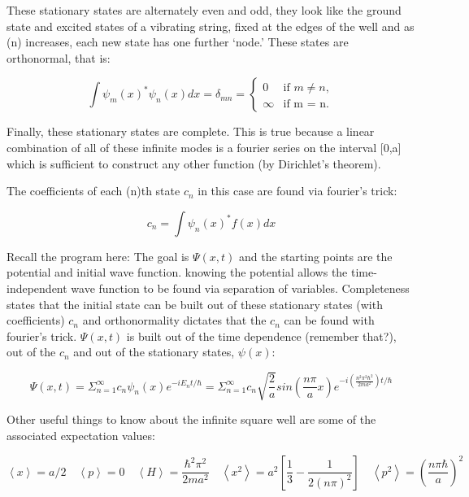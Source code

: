 \documentclass[aps,pre,nofootinbib]{revtex4}
\begin{document}
These stationary states are alternately even and odd, they look like the ground state and excited states of a vibrating string, fixed at the edges of the well and as (n) increases, each new state has one further `node.'  These states are orthonormal, that is:

\begin{equation}
\int \psi_m(x)^* \psi_n(x) dx = \delta_{mn} = 
\begin{cases} 
0 & \text{if $m \neq n$}, \\ 
\infty & \text{if m = n}. 
\end{cases} 
\end{equation}

Finally, these stationary states are complete.  This is true because a linear combination of all of these infinite modes is a fourier series on the interval [0,a] which is sufficient to construct any other function (by Dirichlet's theorem).

The coefficients of each (n)th state $c_n$ in this case are found via fourier's trick:

\begin{equation}
c_n = \int \psi_n(x)^* f(x) dx
\end{equation}

Recall the program here:  The goal is $\Psi(x,t)$ and the starting points are the potential and initial wave function.  knowing the potential allows the time-independent wave function to be found via separation of variables.  Completeness states that the initial state can be built out of these stationary states (with coefficients) $c_n$ and orthonormality dictates that the $c_n$ can be found with fourier's trick.  $\Psi(x,t)$ is built out of the time dependence (remember that?), out of the $c_n$ and out of the stationary states, $\psi(x)$:

\begin{equation}
\Psi(x,t) = \Sigma^{\infty}_{n=1}c_n\psi_n(x)e^{-iE_nt/\hbar} = \Sigma^{\infty}_{n=1}c_n\sqrt{\frac{2}{a}}sin({\frac{n\pi}{a}x})e^{-i(\frac{n^2 \pi^2 \hbar^2}{2ma^2})t/\hbar}
\end{equation}

Other useful things to know about the infinite square well are some of the associated expectation values:

\begin{equation}
\left\langle x\right\rangle =  a/2 \quad \left\langle p\right\rangle =  0 \quad \left\langle H\right\rangle =  \frac{\hbar^2 \pi^2}{2ma^2} \quad \left\langle x^2 \right\rangle =  a^2[\frac{1}{3}-\frac{1}{2(n\pi)^2}] \quad \left\langle p^2\right\rangle =  (\frac{n\pi \hbar}{a})^2
\end{equation}
\end{document}
